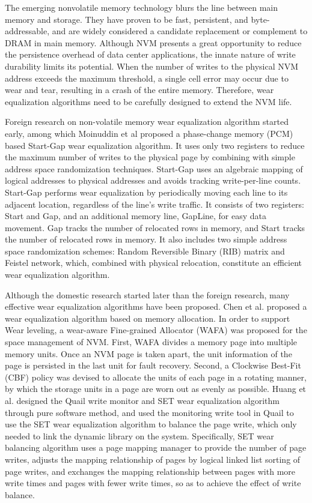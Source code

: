 \documentclass[twocolumn]{article}
\begin{document}
	The emerging nonvolatile memory technology blurs the line between main memory and storage. They have proven to be fast, persistent, and byte-addressable, and are widely considered a candidate replacement or complement to DRAM in main memory. Although NVM presents a great opportunity to reduce the persistence overhead of data center applications, the innate nature of write durability limits its potential. When the number of writes to the physical NVM address exceeds the maximum threshold, a single cell error may occur due to wear and tear, resulting in a crash of the entire memory. Therefore, wear equalization algorithms need to be carefully designed to extend the NVM life.
	
	Foreign research on non-volatile memory wear equalization algorithm started early, among which Moinuddin et al proposed a phase-change memory (PCM) based Start-Gap wear equalization algorithm. It uses only two registers to reduce the maximum number of writes to the physical page by combining with simple address space randomization techniques. Start-Gap uses an algebraic mapping of logical addresses to physical addresses and avoids tracking write-per-line counts. Start-Gap performs wear equalization by periodically moving each line to its adjacent location, regardless of the line's write traffic. It consists of two registers: Start and Gap, and an additional memory line, GapLine, for easy data movement. Gap tracks the number of relocated rows in memory, and Start tracks the number of relocated rows in memory. It also includes two simple address space randomization schemes: Random Reversible Binary (RIB) matrix and Feistel network, which, combined with physical relocation, constitute an efficient wear equalization algorithm.
	
	Although the domestic research started later than the foreign research, many effective wear equalization algorithms have been proposed. Chen et al. proposed a wear equalization algorithm based on memory allocation. In order to support Wear leveling, a wear-aware Fine-grained Allocator (WAFA) was proposed for the space management of NVM. First, WAFA divides a memory page into multiple memory units. Once an NVM page is taken apart, the unit information of the page is persisted in the last unit for fault recovery. Second, a Clockwise Best-Fit (CBF) policy was devised to allocate the units of each page in a rotating manner, by which the storage units in a page are worn out as evenly as possible. Huang et al. designed the Quail write monitor and SET wear equalization algorithm through pure software method, and used the monitoring write tool in Quail to use the SET wear equalization algorithm to balance the page write, which only needed to link the dynamic library on the system. Specifically, SET wear balancing algorithm uses a page mapping manager to provide the number of page writes, adjusts the mapping relationship of pages by logical linked list sorting of page writes, and exchanges the mapping relationship between pages with more write times and pages with fewer write times, so as to achieve the effect of write balance.
	
\end{document}
